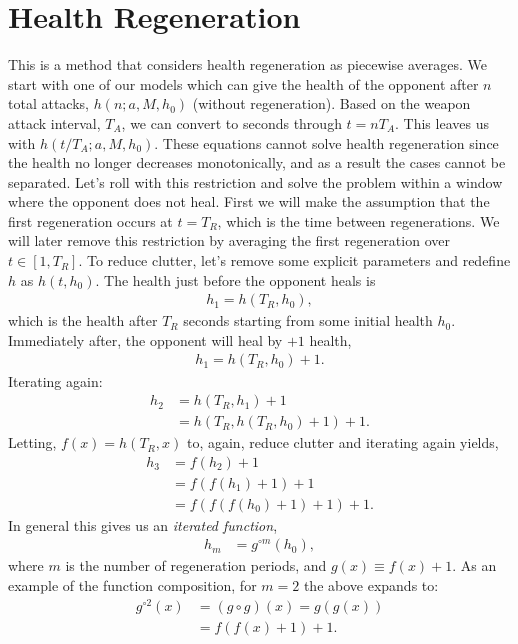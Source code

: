 	\section{Health Regeneration}
		This is a method that considers health regeneration as piecewise averages. We start with one of our models which can give the health of the opponent after $n$ total attacks, $h(n; a, M, h_0)$ (without regeneration). Based on the weapon attack interval, $T_A$, we can convert to seconds through $t = nT_A$. This leaves us with $h(t/T_A; a, M, h_0)$. These equations cannot solve health regeneration since the health no longer decreases monotonically, and as a result the cases cannot be separated. Let's roll with this restriction and solve the problem within a window where the opponent does not heal. First we will make the assumption that the first regeneration occurs at $t=T_R$, which is the time between regenerations. We will later remove this restriction by averaging the first regeneration over $t\in[1, T_R]$. To reduce clutter, let's remove some explicit parameters and redefine $h$ as $h(t, h_0)$. The health just before the opponent heals is
		\begin{align}
			h_1 = h(T_R, h_{0}),
		\end{align}
		which is the health after $T_R$ seconds starting from some initial health $h_0$. Immediately after, the opponent will heal by $+1$ health,
		\begin{align}
			h_1 = h(T_R, h_{0}) + 1.
		\end{align}
		Iterating again:
		\begin{align}
			h_2 &= h(T_R, h_1) + 1 \\
				&= h(T_R, h(T_R, h_0) + 1) + 1.
		\end{align}
		Letting, $f(x)=h(T_R, x)$ to, again, reduce clutter and iterating again yields,
		\begin{align}
			h_3 &= f(h_2) + 1 \\
				&= f(f(h_1) + 1) + 1 \\
				&= f(f(f(h_0) + 1) + 1) + 1.
		\end{align}
		In general this gives us an \textit{iterated function},
		\begin{align}
			h_m &= g^{\circ m}(h_0),
		\end{align}
		where $m$ is the number of regeneration periods, and $g(x) \equiv f(x) + 1$. As an example of the function composition, for $m=2$ the above expands to:
		\begin{align}
			g^{\circ 2}(x)&=(g\circ g)(x)=g(g(x)) \\
						&=f(f(x) + 1) + 1.
		\end{align}
